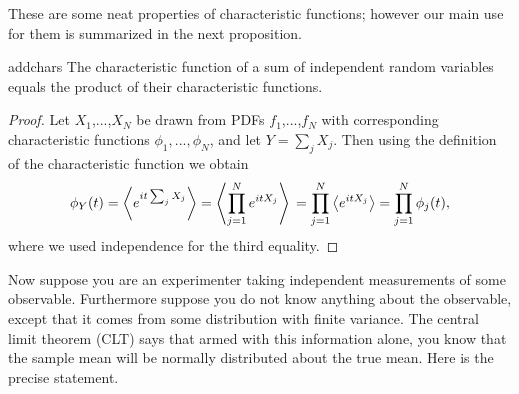 These are some neat properties of characteristic functions; however
our main use for them is summarized in the next proposition.
\begin{proposition}{}{addchars}
  The characteristic function of a sum of independent random variables equals 
  the product of their characteristic functions.
  \begin{proof}
    Let $X_1$,...,$X_N$ be drawn from PDFs $f_1$,...,$f_N$ with
    corresponding characteristic functions $\phi_1,...,\phi_N$, and
    let $Y=\sum_j X_j$. Then using the definition of the characteristic
    function we obtain
    $$
      \phi_Y(t)=\ev{e^{it\sum_j X_j}}=\ev{\prod_{j=1}^N e^{it X_j}}\\
               =\prod_{j=1}^N \ev{e^{it X_j}}=\prod_{j=1}^N\phi_j(t),
    $$
    where we used independence for the third equality.
  \end{proof}
\end{proposition}
Now suppose you are an experimenter taking independent measurements of 
some observable. Furthermore suppose you do not know anything about the 
observable, except that it comes from some distribution with finite variance.
The central limit theorem (CLT) says that armed with this information alone, 
you know that the sample mean will be normally distributed about
the true mean. Here is the precise statement. 
